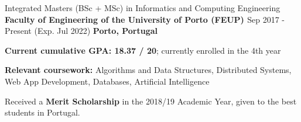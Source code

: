 

\begin{cventries}

  \cventry
    {Integrated Masters (BSc + MSc) in Informatics and Computing Engineering} %
    {\textbf{Faculty of Engineering of the University of Porto (FEUP) \href{https://sigarra.up.pt/feup/en/web_page.inicial}{\faExternalLink}}} %
    {Sep 2017 - Present (Exp. Jul 2022)} %
    {\textbf{Porto, Portugal}} %
    {
      \begin{cvitems} %
        \item {\textbf{Current cumulative GPA: 18.37 / 20}; currently enrolled in the 4th year}
        \item {\textbf{Relevant coursework:} Algorithms and Data Structures, Distributed Systems, Web App Development, Databases, Artificial Intelligence}
        \item {Received a \textbf{Merit Scholarship} in the 2018/19 Academic Year, given to the best students in Portugal.}
      \end{cvitems}
    }

\end{cventries}
